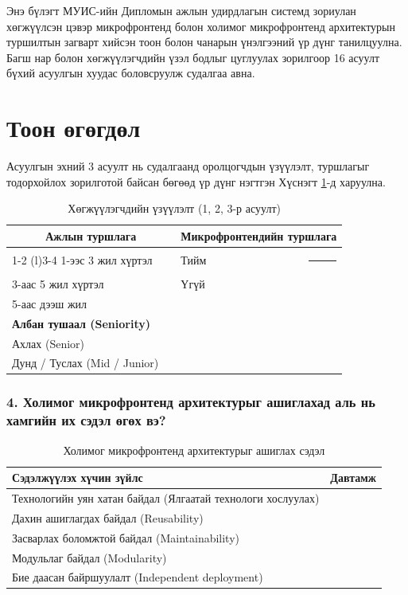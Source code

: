 \label{sec:result}
\hspace*{1cm}Энэ бүлэгт МУИС-ийн Дипломын ажлын удирдлагын системд зориулан хөгжүүлсэн цэвэр микрофронтенд болон холимог микрофронтенд архитектурын туршилтын загварт хийсэн тоон болон чанарын үнэлгээний үр дүнг танилцуулна. Багш нар болон хөгжүүлэгчдийн үзэл бодлыг цуглуулах зорилгоор 16 асуулт бүхий асуулгын хуудас боловсруулж судалгаа авна.
\section{Тоон өгөгдөл}
Асуулгын эхний 3 асуулт нь судалгаанд оролцогчдын үзүүлэлт, туршлагыг тодорхойлох зорилготой байсан бөгөөд үр дүнг нэгтгэн Хүснэгт \ref{tab:demographics}-д харуулна.

\begin{table}[h!]
\centering
\small %
\renewcommand{\arraystretch}{0.7} %
\begin{tabular}{lc lc}
\toprule
\multicolumn{2}{c}{\textbf{Ажлын туршлага}} & \multicolumn{2}{c}{\textbf{Микрофронтендийн туршлага}} \\ 
\cmidrule(r){1-2} \cmidrule(l){3-4}
1-ээс 3 жил хүртэл & \rule{1cm}{0pt} & Тийм & \rule{1cm}{0pt} \\ 
3-аас 5 жил хүртэл & & Үгүй & \\ 
5-аас дээш жил & & & \\ 
\midrule
\multicolumn{4}{l}{\textbf{Албан тушаал (Seniority)}} \\ 
\midrule
Ахлах (Senior) & \multicolumn{3}{c}{} \\ 
Дунд / Туслах (Mid / Junior) & \multicolumn{3}{c}{} \\ 
\bottomrule
\end{tabular}
\caption{Хөгжүүлэгчдийн үзүүлэлт (1, 2, 3-р асуулт)}
\label{tab:demographics}
\end{table}

\subsubsection{4. Холимог микрофронтенд архитектурыг ашиглахад аль нь хамгийн их сэдэл өгөх вэ?}
\begin{table}[h!]
\centering
\renewcommand{\arraystretch}{0.7}
\begin{tabular}{lc}
\toprule
\textbf{Сэдэлжүүлэх хүчин зүйлс} & \textbf{Давтамж} \\ 
\midrule
Технологийн уян хатан байдал (Ялгаатай технологи хослуулах) & \\ 
Дахин ашиглагдах байдал (Reusability) & \\ 
Засварлах боломжтой байдал (Maintainability) & \\ 
Модульлаг байдал (Modularity) & \\ 
Бие даасан байршуулалт (Independent deployment) & \\ 
\bottomrule
\end{tabular}
\caption{Холимог микрофронтенд архитектурыг ашиглах сэдэл}
\label{tab:motivation}
\end{table}

